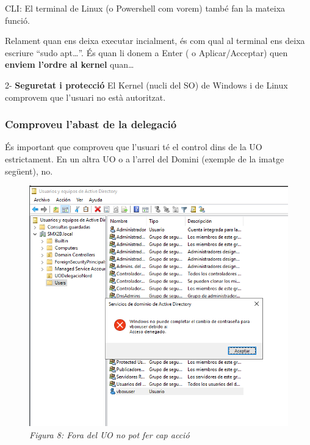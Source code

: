 \documentclass[
  a4paper,
]{article}
\begin{document}
CLI: El terminal de Linux (o Powershell com vorem) també fan la mateixa
funció.

Relament quan ens deixa executar incialment, és com qual al terminal ens
deixa escriure ``sudo apt\ldots{}''. És quan li donem a Enter ( o
Aplicar/Acceptar) quen \textbf{enviem l'ordre al kernel} quan\ldots{}

2- \textbf{Seguretat i protecció} El Kernel (nucli del SO) de Windows i
de Linux comprovem que l'usuari no està autoritzat.

\subsubsection{Comproveu l'abast de la
delegació}\label{comproveu-labast-de-la-delegaciuxf3}

És important que comproveu que l'usuari té el control dins de la UO
estrictament. En un altra UO o a l'arrel del Domini (exemple de la
imatge següent), no.

\begin{figure}
\centering
\includegraphics{png/NoTienePrivilegios.png}
\caption{\emph{Figura 8: Fora del UO no pot fer cap acció}}
\end{figure}
\end{document}
